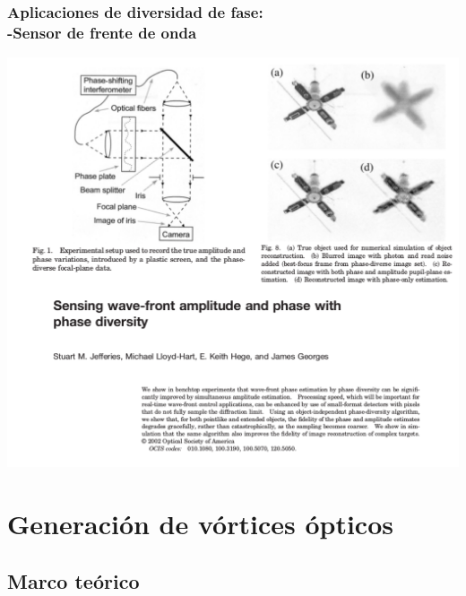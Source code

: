 \documentclass[serif,8pt]{beamer}
\begin{document}
		\begin{frame}
		\frametitle{Aplicaciones de diversidad de fase:\\ -Sensor de frente de onda}
			\begin{center}
				\includegraphics[scale=0.4]{img/PDWFS.pdf}
			\end{center}
		\end{frame}
		


	
				
\section{Generación de vórtices ópticos}
	\setcounter{subsection}{1}				

	\subsection{Marco teórico}
	
\end{document}
